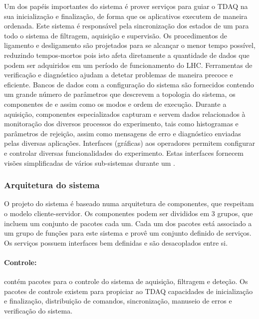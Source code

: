 Um dos papéis importantes do sistema  é prover serviços para guiar
o TDAQ na sua inicialização e finalização, de forma que os aplicativos
executem de maneira ordenada. Este sistema é responsável pela sincronização
dos estados de um  para todo o sistema de filtragem, aquisição e
supervisão. Os procedimentos de ligamento e desligamento são projetados para
se alcançar o menor tempo possível, reduzindo tempos-mortos pois isto afeta
diretamente a quantidade de dados que podem ser adquiridos em um período de
funcionamento do LHC. Ferramentas de verificação e diagnóstico ajudam a
detetar problemas de maneira precoce e eficiente. Bancos de dados com a
configuração do sistema são fornecidos contendo um grande número de parâmetros
que descrevem a topologia do sistema, os componentes de
 e  assim como os modos e ordem de
execução. Durante a aquisição, componentes especializados capturam e servem
dados relacionados à monitoração dos diversos processos do experimento, tais
como histogramas e parâmetros de rejeição, assim como mensagens de erro e
diagnóstico enviadas pelas diversas aplicações. Interfaces (gráficas) aos
operadores permitem configurar e controlar diversas funcionalidades do
experimento. Estas interfaces fornecem visões simplificadas de vários
sub-sistemas durante um .

\subsubsection{Arquitetura do sistema }
\label{sec:online-arch}

O projeto do sistema  é baseado numa arquitetura de componentes,
que respeitam o modelo cliente-servidor. Os componentes podem ser divididos em 3
grupos, que incluem um conjunto de pacotes cada um. Cada um dos pacotes está
associado a um grupo de funções para este sistema e provê um conjunto definido
de serviços. Os serviços possuem interfaces bem definidas e são desacoplados
entre si.

\paragraph{Controle:} contém pacotes para o controle do sistema de
aquisição, filtragem e deteção. Os pacotes de controle existem para propiciar
ao TDAQ capacidades de inicialização e finalização, distribuição de comandos,
sincronização, manuseio de erros e verificação do sistema.

